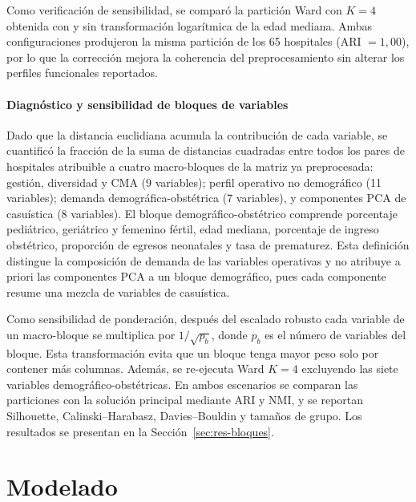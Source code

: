 Como verificación de sensibilidad, se comparó la partición Ward con $K=4$
obtenida con y sin transformación logarítmica de la edad mediana. Ambas
configuraciones produjeron la misma partición de los 65 hospitales
(ARI $= 1{,}00$), por lo que la corrección mejora la coherencia del
preprocesamiento sin alterar los perfiles funcionales reportados.

\paragraph{Diagnóstico y sensibilidad de bloques de variables}
\label{sec:bloques-variables}

Dado que la distancia euclidiana acumula la contribución de cada variable, se
cuantificó la fracción de la suma de distancias cuadradas entre todos los pares
de hospitales atribuible a cuatro macro-bloques de la matriz ya preprocesada:
gestión, diversidad y CMA (9 variables); perfil operativo no demográfico (11 variables);
demanda demográfica-obstétrica (7 variables), y componentes PCA de casuística (8 variables). El
bloque demográfico-obstétrico comprende porcentaje pediátrico, geriátrico y
femenino fértil, edad mediana, porcentaje de ingreso obstétrico, proporción de
egresos neonatales y tasa de prematurez. Esta definición distingue la
composición de demanda de las variables operativas y no atribuye a priori las
componentes PCA a un bloque demográfico, pues cada componente resume una mezcla
de variables de casuística.

Como sensibilidad de ponderación, después del escalado robusto cada variable de
un macro-bloque se multiplica por $1/\sqrt{p_b}$, donde $p_b$ es el número de
variables del bloque. Esta transformación evita que un bloque tenga mayor peso
solo por contener más columnas. Además, se re-ejecuta Ward $K=4$ excluyendo las
siete variables demográfico-obstétricas. En ambos escenarios se comparan las
particiones con la solución principal mediante ARI y NMI, y se reportan
Silhouette, Calinski--Harabasz, Davies--Bouldin y tamaños de grupo. Los
resultados se presentan en la Sección~\ref{sec:res-bloques}.

\section{Modelado}
\label{sec:metodo-clustering}

